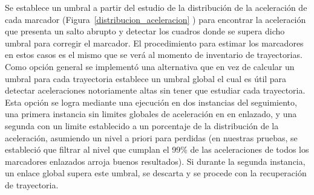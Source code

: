 \begin{itemize}
Se establece un umbral a partir del estudio de la distribución de la aceleración de cada marcador (Figura~\ref{distribucion_aceleracion} ) para encontrar la aceleración que presenta un salto abrupto y detectar los cuadros donde se supera dicho umbral para corregir el marcador. El procedimiento para estimar los marcadores en estos casos es el mismo que se verá al momento de inventario de trayectorias. 
\\ 

Como opción general se implementó una alternativa que en vez de calcular un umbral para cada trayectoria establece un umbral global el cual es útil para detectar aceleraciones notoriamente altas sin tener que estudiar cada trayectoria. Esta opción se logra mediante una ejecución en dos instancias del seguimiento, una primera instancia sin limites globales de aceleración en en enlazado, y una segunda con un limite establecido a un porcentaje de la distribución de la aceleración, asumiendo un nivel a priori para perdidas (en nuestras pruebas, se estableció que filtrar al nivel que cumplan el 99\% de las aceleraciones de todos los marcadores enlazados arroja buenos resultados). Si durante la segunda instancia, un enlace global supera este umbral, se descarta y se procede con la recuperación de trayectoria.


\end{itemize}
